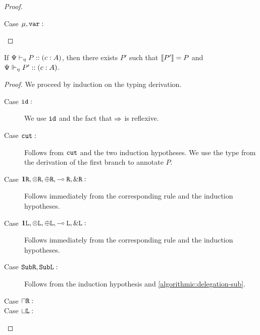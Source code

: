 \begin{proof}
\begin{description}
    \item[Case $\mu, \texttt{var} :$] 
  \end{description}
\end{proof}


\begin{theorem}
  If ${\Psi} \vdash_{\eta} P :: (c : A)$, then there exists $P'$ such that $\llbracket P'\rrbracket = P$ and ${\Psi} \Vdash_{\eta} P' :: (c : A)$.
\end{theorem}
\begin{proof}
  We proceed by induction on the typing derivation.
  \begin{description}
    \item[Case $\texttt{id} :$] We use $\texttt{id}$ and the fact that $\mathrel\Rightarrow$ is reflexive.
    \item[Case $\texttt{cut} :$] Follows from $\texttt{cut}$ and the two induction hypotheses. We use the type from the derivation of the first branch to annotate $P$.

    \item[Case $\mathbf{1}\texttt{R}, \otimes\texttt{R}, \oplus\texttt{R}, \multimap\texttt{R}, \&\texttt{R} :$] Follows immediately from the corresponding rule and the induction hypotheses.
    \item[Case $\mathbf{1}\texttt{L}, \otimes\texttt{L}, \oplus\texttt{L}, \multimap\texttt{L}, \&\texttt{L} :$] Follows immediately from the corresponding rule and the induction hypotheses.

    \item[Case $\texttt{Sub}\texttt{R}, \texttt{Sub}\texttt{L} :$] Follows from the induction hypothesis and \cref{algorithmic:delegation-sub}.

    \item[Case $\mathbin{\sqcap}\texttt{R} :$] 
    \item[Case $\mathbin{\sqcup}\texttt{L} :$] 

  \end{description}

\end{proof}
